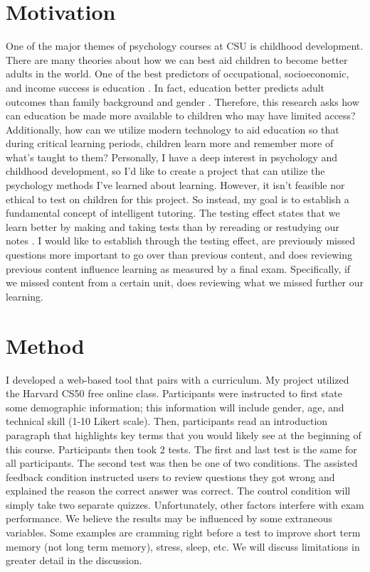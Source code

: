 \documentclass[acmtog]{acmart}
\begin{document}
\section{Motivation}
One of the major themes of psychology courses at CSU is childhood development. There are many theories about how we can best aid children to become better adults in the world. One of the best predictors of occupational, socioeconomic, and income success is education \cite{becker2019childhood}. In fact, education better predicts adult outcomes than family background and gender \cite{becker2019childhood}. Therefore, this research asks how can education be made more available to children who may have limited access? Additionally, how can we utilize modern technology to aid education so that during critical learning periods, children learn more and remember more of what’s taught to them? Personally, I have a deep interest in psychology and childhood development, so I’d like to create a project that can utilize the psychology methods I’ve learned about learning. However, it isn't feasible nor ethical to test on children for this project. So instead, my goal is to establish a fundamental concept of intelligent tutoring. The testing effect states that we learn better by making and taking tests than by rereading or restudying our notes \cite{su2021levels}. I would like to establish through the testing effect, are previously missed questions more important to go over than previous content, and does reviewing previous content influence learning as measured by a final exam. Specifically, if we missed content from a certain unit, does reviewing what we missed further our learning.

\section{Method}
I developed a web-based tool that pairs with a curriculum. My project utilized the Harvard CS50 free online class. Participants were instructed to first state some demographic information; this information will include gender, age, and technical skill (1-10 Likert scale). Then, participants read an introduction paragraph that highlights key terms that you would likely see at the beginning of this course. Participants then took 2 tests. The first and last test is the same for all participants. The second test was then be one of two conditions. The assisted feedback condition instructed users to review questions they got wrong and explained the reason the correct answer was correct. The control condition will simply take two separate quizzes. Unfortunately, other factors interfere with exam performance. We believe the results may be influenced by some extraneous variables. Some examples are cramming right before a test to improve short term memory (not long term memory), stress, sleep, etc. We will discuss limitations in greater detail in the discussion.
\end{document}
